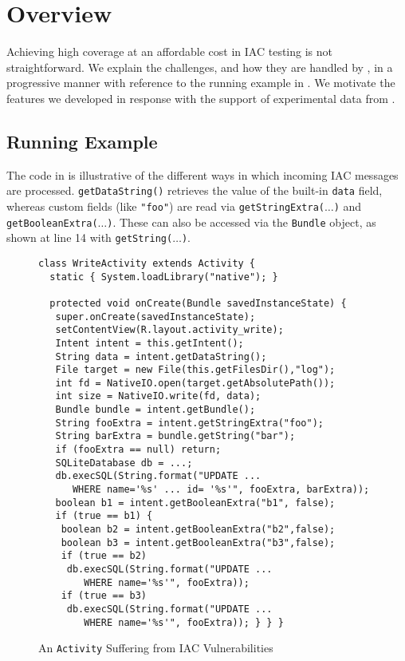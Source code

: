 \section{Overview}

Achieving high coverage at an affordable cost in IAC testing is not straightforward. We explain the challenges, and how they are handled by \Tool, in a progressive manner with reference to the running example in . We motivate the features we developed in response with the support of experimental data from .

\subsection{Running Example}

The code in  is illustrative of the different ways in which incoming IAC messages are processed. {\tt getDataString()} retrieves the value of the built-in {\tt data} field, whereas custom fields (like {\tt "foo"}) are read via {\tt getStringExtra($\ldots$)} and {\tt getBooleanExtra($\ldots$)}. These can also be accessed via the {\tt Bundle} object, as shown at line 14 with {\tt getString($\ldots$)}.

\begin{figure}
	\begin{scriptsize}
	\begin{lstlisting}[showstringspaces=false]
class WriteActivity extends Activity {
  static { System.loadLibrary("native"); }

  protected void onCreate(Bundle savedInstanceState) {
   super.onCreate(savedInstanceState);
   setContentView(R.layout.activity_write);
   Intent intent = this.getIntent();
   String data = intent.getDataString();	
   File target = new File(this.getFilesDir(),"log");
   int fd = NativeIO.open(target.getAbsolutePath());	
   int size = NativeIO.write(fd, data);		 
   Bundle bundle = intent.getBundle();
   String fooExtra = intent.getStringExtra("foo");
   String barExtra = bundle.getString("bar");		
   if (fooExtra == null) return;	
   SQLiteDatabase db = ...;
   db.execSQL(String.format("UPDATE ... 
      WHERE name='%s' ... id= '%s'", fooExtra, barExtra));	
   boolean b1 = intent.getBooleanExtra("b1", false);
   if (true == b1) {
    boolean b2 = intent.getBooleanExtra("b2",false);
    boolean b3 = intent.getBooleanExtra("b3",false);
    if (true == b2)
     db.execSQL(String.format("UPDATE ... 
        WHERE name='%s'", fooExtra));
    if (true == b3)
     db.execSQL(String.format("UPDATE ... 
        WHERE name='%s'", fooExtra)); } } }
	\end{lstlisting}
		\end{scriptsize}
	\caption{\label{Fi:techExample}An \texttt{Activity} Suffering from IAC Vulnerabilities}
\end{figure}

